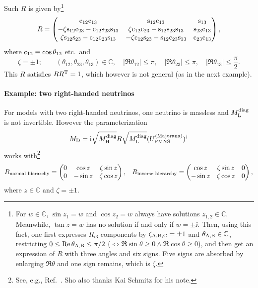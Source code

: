 \documentclass[CheatSheet]{subfiles}
\newcommand\MD[1][]{M_{\mathrm{D}#1}}
\begin{document}
Such $R$ is given by\footnote{For $w\in\mathbb C$, $\sin z_1=w$ and $\cos z_2=w$ always have solutions $z_{1,2}\in\mathbb C$. Meanwhile, $\tan z=w$ has no solution if and only if $w=\pm \ii$. Then, using this fact, one first expresses $R_{i3}$ components by $\zeta_{\mathrm{A,B,C}}=\pm1$ and $\theta_{\mathrm{A,B}}\in\mathbb C$, restricting $0\le\mathop{\mathrm{Re}}\theta_{\mathrm{A,B}}\le\pi/2$ ($\Leftrightarrow\Re{\sin{\theta}}\ge0\land\Re\cos\theta\ge0$), and then get an expression of $R$ with three angles and six signs. Five signs are absorbed by enlarging $\Re\theta$ and one sign remains, which is $\zeta$.}
\begin{equation}
 R=\begin{pmatrix}
 \mathrm{c}_{12} \mathrm{c}_{13} & \mathrm{s}_{12} \mathrm{c}_{13} & \mathrm{s}_{13} \\
 -\zeta \mathrm{s}_{12} \mathrm{c}_{23}-\mathrm{c}_{12} \mathrm{s}_{23} \mathrm{s}_{13} & \zeta \mathrm{c}_{12} \mathrm{c}_{23} -\mathrm{s}_{12} \mathrm{s}_{23} \mathrm{s}_{13} & \mathrm{s}_{23} \mathrm{c}_{13} \\
  \zeta \mathrm{s}_{12} \mathrm{s}_{23}-\mathrm{c}_{12} \mathrm{c}_{23} \mathrm{s}_{13} & -\zeta\mathrm{c}_{12} \mathrm{s}_{23} -\mathrm{s}_{12} \mathrm{c}_{23} \mathrm{s}_{13} & \mathrm{c}_{23} \mathrm{c}_{13}
\end{pmatrix},
\end{equation}
where $\mathrm{c}_{12}\equiv \cos{\theta_{12}}$ etc.\ and
\begin{equation}
 \zeta=\pm1; \qquad
(\theta_{12},\theta_{23},\theta_{13})\in\mathbb C,\quad
|\Re\theta_{12}|\le\pi, \quad |\Re\theta_{23}|\le\pi,  \quad |\Re\theta_{13}|\le\frac{\pi}{2}.
\end{equation}
This $R$ satisfies $RR^{\mathrm{T}}=1$, which however is not general (as in the next example).

\paragraph{Example: two right-handed neutrinos}
For models with two right-handed neutrinos, one neutrino is massless and $M_{\mathrm{L}}^{\text{diag}}$ is not invertible. However the parameterization
\begin{equation}
 \MD = \ii \sqrt{M\w H^\text{diag}}R\sqrt{M\w L^\text{diag}}(U^{\text{(Majorana)}}\w{PMNS} )^\dagger
\end{equation}
works with\footnote{See, e.g., Ref.~\cite{Brdar:2019iem}. Sho also thanks Kai Schmitz for his note.}
\begin{align}
 R_{\text{normal hierarchy}}&=\begin{pmatrix}0 & \cos z & \zeta\sin z \\ 0 & -\sin z & \zeta \cos z\end{pmatrix},&
 R_{\text{inverse hierarchy}}=\begin{pmatrix}\cos z & \zeta\sin z &0 \\ -\sin z & \zeta \cos z & 0\end{pmatrix},
\end{align}
where $z\in\mathbb C$ and $\zeta=\pm1$.
\end{document}
